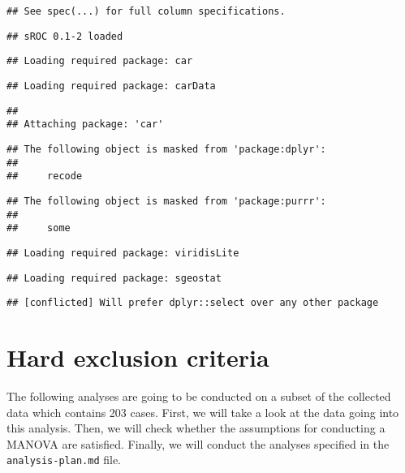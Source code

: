 \documentclass[12pt,]{article}
\begin{document}
\begin{verbatim}
## See spec(...) for full column specifications.
\end{verbatim}

\begin{verbatim}
## sROC 0.1-2 loaded
\end{verbatim}

\begin{verbatim}
## Loading required package: car
\end{verbatim}

\begin{verbatim}
## Loading required package: carData
\end{verbatim}

\begin{verbatim}
## 
## Attaching package: 'car'
\end{verbatim}

\begin{verbatim}
## The following object is masked from 'package:dplyr':
## 
##     recode
\end{verbatim}

\begin{verbatim}
## The following object is masked from 'package:purrr':
## 
##     some
\end{verbatim}

\begin{verbatim}
## Loading required package: viridisLite
\end{verbatim}

\begin{verbatim}
## Loading required package: sgeostat
\end{verbatim}

\begin{verbatim}
## [conflicted] Will prefer dplyr::select over any other package
\end{verbatim}

\hypertarget{hard-exclusion-criteria}{%
\section{Hard exclusion criteria}\label{hard-exclusion-criteria}}

The following analyses are going to be conducted on a subset of the
collected data which contains 203 cases. First, we will take a look at
the data going into this analysis. Then, we will check whether the
assumptions for conducting a MANOVA are satisfied. Finally, we will
conduct the analyses specified in the \texttt{analysis-plan.md} file.
\end{document}
